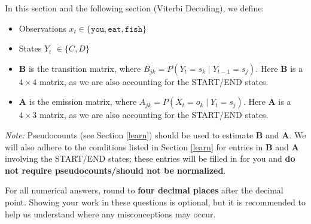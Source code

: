 \documentclass[11pt,addpoints,answers]{exam}
\begin{document}
\begin{questions}
In this section and the following section (Viterbi Decoding), we define:
\begin{itemize}
    \item Observations $x_t \in \{\texttt{you}, \texttt{eat}, \texttt{fish}\}$
    \item States $Y_t$ $\in \{C,D\}$
    \item $\mathbf{B}$ is the transition matrix, where $B_{jk} = P(Y_{t} = s_{k} \mid Y_{t-1} = s_{j})$. Here $\mathbf{B}$ is a $4 \times 4$ matrix, as we are also accounting for the START/END states.  
    \item $\mathbf{A}$ is the emission matrix, where $A_{jk} = P(X_{t} = o_k \mid Y_{t} = s_{j})$. Here $\mathbf{A}$ is a $4 \times 3$ matrix, as we are also accounting for the START/END states. 
\end{itemize} 

\textit{Note:} Pseudocounts (see Section \ref{learn}) should be used to estimate $\mathbf{B}$ and $\mathbf{A}$. We will also adhere to the conditions listed in Section \ref{learn} for entries in $\mathbf{B}$ and $\mathbf{A}$ involving the START/END states; these entries will be filled in for you and \textbf{do not require pseudocounts/should not be normalized}.

For all numerical answers, round to \textbf{four decimal places} after the decimal point. Showing your work in these questions is optional, but it is recommended to help us understand where any misconceptions may occur.

\begin{parts}

\end{parts}
\end{questions}
\end{document}
